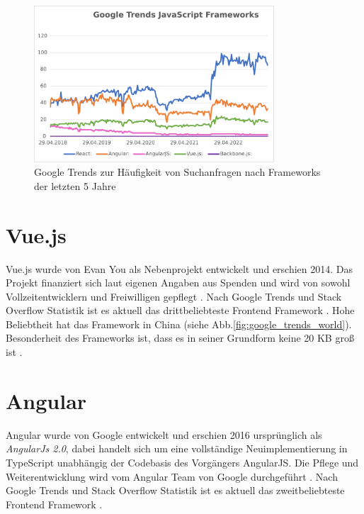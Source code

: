 \begin{figure}[!htb]
    \centering
    \includegraphics[width=0.8\textwidth]{img/Google Stats/google_frameworks_trends}
    \caption{Google Trends zur Häufigkeit von Suchanfragen nach Frameworks der letzten 5 Jahre \cite{googleTrends}}
    \label{fig:google_trends}
\end{figure}


\section{Vue.js}
Vue.js wurde von Evan You als Nebenprojekt entwickelt und erschien 2014.
Das Projekt finanziert sich laut eigenen Angaben aus Spenden und
wird von sowohl Vollzeitentwicklern und Freiwilligen gepflegt \cite{vueFAQ}.
Nach Google Trends und Stack Overflow Statistik ist es aktuell das drittbeliebteste
Frontend Framework \cite{googleTrends} \cite{stackoverflowStats}.
Hohe Beliebtheit hat das Framework in China (siehe Abb.\ref{fig:google_trends_world}).
Besonderheit des Frameworks ist, dass es in seiner Grundform keine 20 KB groß ist \cite[S. 523]{bin2019}.


\section{Angular}
Angular wurde von Google entwickelt und erschien 2016 ursprünglich als \emph{AngularJs 2.0},
dabei handelt sich um eine vollständige Neuimplementierung in TypeScript unabhängig der Codebasis des Vorgängers AngularJS.
Die Pflege und Weiterentwicklung wird vom Angular Team von Google durchgeführt \cite[S. 209-210]{bin2019}.
Nach Google Trends und Stack Overflow Statistik ist es aktuell das zweitbeliebteste
Frontend Framework \cite{googleTrends} \cite{stackoverflowStats}.

\newpage

